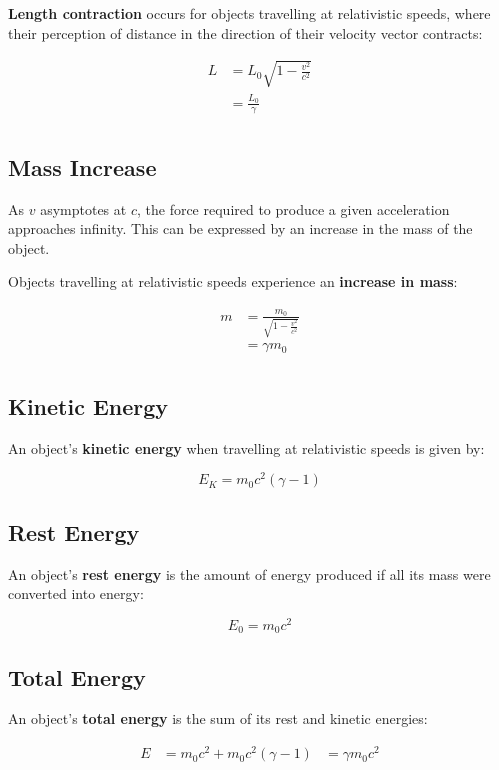 \documentclass[a4paper,11pt]{report}
\begin{document}
\textbf{Length contraction} occurs for objects travelling at relativistic
speeds, where their perception of distance in the direction of their velocity
vector contracts:

$$
\begin{aligned}
L & = L_0 \sqrt{1 - \frac{v^2}{c^2}} \\
& = \frac{L_0}{\gamma} \\
\end{aligned}
$$

\subsection{Mass Increase}

As $v$ asymptotes at $c$, the force required to produce a given acceleration
approaches infinity. This can be expressed by an increase in the mass of the
object.

Objects travelling at relativistic speeds experience an \textbf{increase in
mass}:

$$
\begin{aligned}
m & = \frac{m_0}{\sqrt{1 - \frac{v^2}{c^2}}} \\
& = \gamma m_0 \\
\end{aligned}
$$

\subsection{Kinetic Energy}

An object's \textbf{kinetic energy} when travelling at relativistic speeds is
given by:

$$
E_K = m_0 c^2 (\gamma - 1)
$$

\subsection{Rest Energy}

An object's \textbf{rest energy} is the amount of energy produced if all its
mass were converted into energy:

$$
E_0 = m_0 c^2
$$

\subsection{Total Energy}

An object's \textbf{total energy} is the sum of its rest and kinetic energies:

$$
\begin{aligned}
E & = m_0 c^2 + m_0 c^2 (\gamma - 1)
& = \gamma m_0 c^2
\end{aligned}
$$
\end{document}
